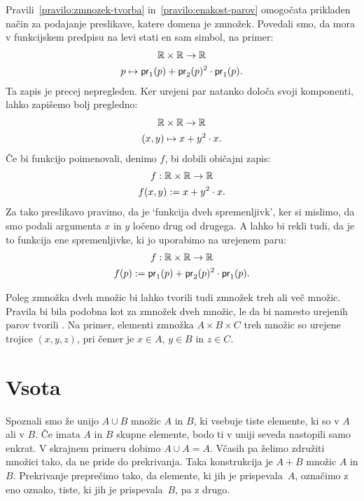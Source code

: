 Pravili~\ref{pravilo:zmnozek-tvorba} in~\ref{pravilo:enakost-parov} omogočata prikladen način za podajanje preslikave, katere domena je zmnožek. Povedali smo, da mora v funkcijskem predpisu na levi stati en sam simbol, na primer:
%
\begin{gather*}
  \RR \times \RR \to \RR \\
  p \mapsto \fst(p) + \snd(p)^2 \cdot \fst(p).
\end{gather*}
%
Ta zapis je precej nepregleden. Ker urejeni par natanko določa svoji komponenti, lahko zapišemo bolj pregledno:
%
\begin{gather*}
  \mathbb{R} \times \mathbb{R} \to \mathbb{R} \\
  (x, y) \mapsto x + y^2 \cdot x.
\end{gather*}
%
Če bi funkcijo poimenovali, denimo $f$, bi dobili običajni zapis:
%
\begin{gather*}
  f : \mathbb{R} \times \mathbb{R} \to \mathbb{R} \\
  f(x, y) \mathrel{{:}{=}} x + y^2 \cdot x.
\end{gather*}
%
Za tako preslikavo pravimo, da je `funkcija dveh spremenljivk', ker si mislimo, da smo
podali argumenta $x$ in $y$ ločeno drug od drugega. A lahko bi rekli tudi, da je to funkcija
ene spremenljivke, ki jo uporabimo na urejenem paru:
%
\begin{gather*}
  f : \RR \times \RR \to \RR \\
  f(p) \dfeq \fst(p) + \snd(p)^2 \cdot \fst(p).
\end{gather*}


Poleg zmnožka dveh množic bi lahko tvorili tudi zmnožek treh ali več množic. Pravila bi bila podobna kot za zmnožek dveh
množic, le da bi namesto urejenih parov tvorili . Na primer, elementi zmnožka
$A \times B \times C$ treh množic so urejene trojice $(x, y, z)$, pri čemer je $x \in A$, $y \in B$ in $z \in C$.


\section{Vsota}
\label{sec:vsota}

Spoznali smo že unijo $A \cup B$ množic $A$ in $B$, ki vsebuje tiste elemente, ki so v $A$
ali v $B$. Če imata $A$ in $B$ skupne elemente, bodo ti v uniji seveda nastopili samo
enkrat. V skrajnem primeru dobimo $A \cup A = A$. Včasih pa želimo združiti množici tako,
da ne pride do prekrivanja. Taka konstrukcija je  $A + B$ množic $A$ in $B$.
Prekrivanje preprečimo tako, da elemente, ki jih je prispevala~$A$, označimo z eno oznako,
tiste, ki jih je prispevala~$B$, pa z drugo.

